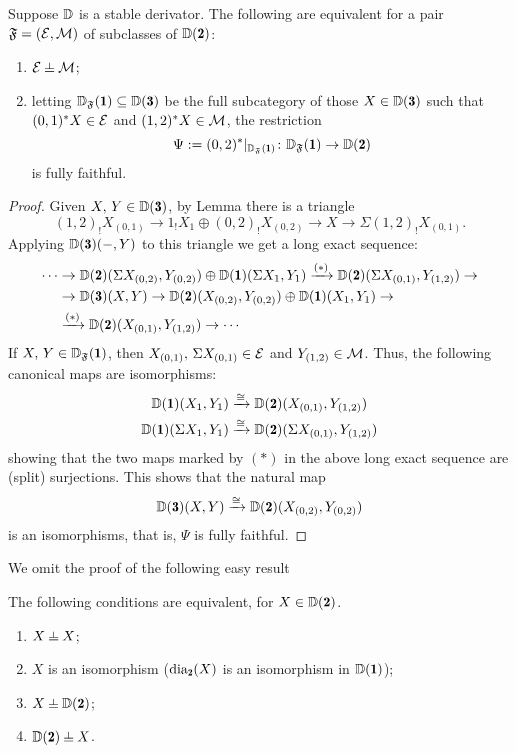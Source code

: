 \begin{lemma}\label{level_wise_ff}
Suppose $\mathbb{D}$ is a stable derivator. The following are equivalent for a pair $\mathfrak{F}=(\mathcal{E},\mathcal{M})$ of subclasses of $\D(\due)$:
\begin{enumerate}
\item $\E\corth \M$;
\item letting $\D_\F(\uno)\subseteq \D(\tre)$ be the full subcategory of those $X\in \D(\tre)$ such that $(0,1)^*X\in \mathcal{E}$ and $(1,2)^*X\in\mathcal{M}$, the restriction 
\[
\Psi:=(0,2)^*\restriction_{\D_\F(\uno)}\colon \D_\F(\uno)\to \D(\due)
\] 
is fully faithful. 
\end{enumerate}
\end{lemma}
\begin{proof}
Given $X,\, Y\in \D(\tre)$, by Lemma  there is a triangle
\[
(1,2)_!X_{(0,1)}\to 1_!X_1\oplus (0,2)_!X_{(0,2)}\to X\to \Sigma (1,2)_!X_{(0,1)}.
\]
Applying $\D(\tre)(-,Y)$ to this triangle we get a long exact sequence:
\begin{align*}
\cdots&\to \D(\due)(\Sigma X_{(0,2)},Y_{(0,2)})\oplus\D(\uno)(\Sigma X_1,Y_1)\xto{(*)} \D(\due)(\Sigma X_{(0,1)},Y_{(1,2)})\to\notag\\
&\to\D(\tre)(X,Y)\to\D(\due)(X_{(0,2)},Y_{(0,2)})\oplus\D(\uno)(X_1,Y_1)\to\notag\\
&\xto{(*)} \D(\due)(X_{(0,1)},Y_{(1,2)})\to \cdots%
\end{align*}
If $X,\, Y\in\D_{\F}(\uno)$, then $X_{(0,1)},\, \Sigma X_{(0,1)}\in \mathcal{E}$ and $Y_{(1,2)}\in\mathcal{M}$. Thus, the following canonical maps are isomorphisms:
\begin{gather*}
\D(\uno)(X_1,Y_1)\xto{\cong}\D(\due)(X_{(0,1)},Y_{(1,2)})\\
\D(\uno)(\Sigma X_1,Y_1)\xto{\cong}\D(\due)(\Sigma X_{(0,1)},Y_{(1,2)})
\end{gather*}
showing that the two maps marked by $(*)$ in the above long exact sequence are (split) surjections. This shows that the natural map
\[
\D(\tre)(X,Y)\xto{\cong} \D(\due)(X_{(0,2)},Y_{(0,2)})
\]
is an isomorphisms, that is, $\Psi$ is fully faithful.
\end{proof}



We omit the proof of the following easy result

\begin{proposition}\label{ortho_to_self}
The following conditions are equivalent, for $X\in\D(\due)$.
\begin{enumerate}
	\item $X\corth X$;
	\item $X$ is an isomorphism (\ie $\dia_\due(X)$ is an isomorphism in $\D(\uno)$);%
	\item $X\corth \D(\due)$;
	\item $\D(\due)\corth X$.
\end{enumerate}
\end{proposition}



